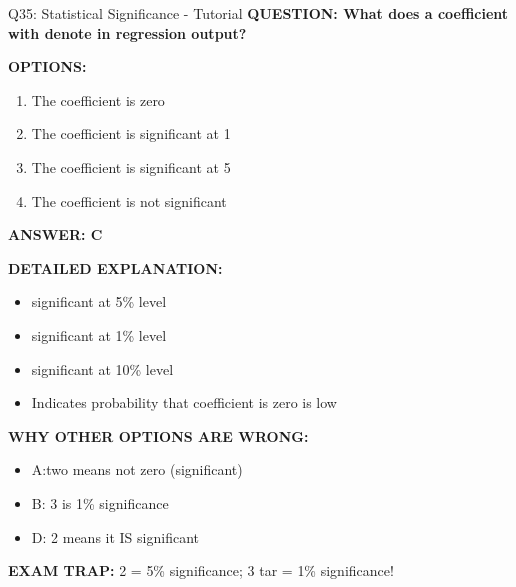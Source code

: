 \documentclass[8pt]{beamer}
\begin{document}
	\begin{frame}{Q35: Statistical Significance - Tutorial}
		\fontsize{6.5}{7.5}\selectfont
		\textbf{QUESTION: What does a coefficient with  denote in regression output?}
		
		\vspace{0.1cm}
		\textbf{OPTIONS:}
		\begin{enumerate}
			\item The coefficient is zero
			\item The coefficient is significant at 1%
			\item The coefficient is significant at 5%
			\item The coefficient is not significant
		\end{enumerate}
		
		\vspace{0.1cm}
		\textcolor{myblue}{\textbf{ANSWER: C}}
		
		\vspace{0.1cm}
		\textbf{DETAILED EXPLANATION:}
		\begin{itemize}
			\item  significant at 5\% level
			\item   significant at 1\% level
			\item  significant at 10\% level
			\item Indicates probability that coefficient is zero is low
		\end{itemize}
		
		\vspace{0.1cm}
		\textcolor{myred}{\textbf{WHY OTHER OPTIONS ARE WRONG:}}
		\begin{itemize}
			\item \textcolor{myred}{A:}two  means not zero (significant)
			\item \textcolor{myred}{B:} 3 is 1\% significance
			\item \textcolor{myred}{D:} 2 means it IS significant
		\end{itemize}
		
		\textcolor{myred}{\textbf{EXAM TRAP:}} 2 = \textcolor{myblue}{5\% significance};  3 tar = \textcolor{myblue}{1\% significance}!
	\end{frame}
	
\end{document}
